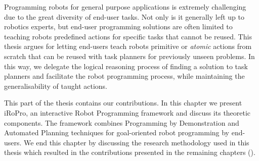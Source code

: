 \minitoc%
Programming robots for general purpose applications is extremely challenging due to the great diversity of end-user tasks.
Not only is it generally left up to robotics experts, but end-user programming solutions are often limited to teaching robots predefined actions for specific tasks that cannot be reused.
This thesis argues for letting end-users teach robots primitive or \textit{atomic} actions from scratch that can be reused with task planners for previously unseen problems.
In this way, we delegate the logical reasoning process of finding a solution to task planners and facilitate the robot programming process, while maintaining the generalisability of taught actions.

This part of the thesis contains our contributions.
In this chapter we present iRoPro, an interactive Robot Programming framework and discuss its theoretic components.
The framework combines Programming by Demonstration and Automated Planning techniques for goal-oriented robot programming by end-users.
We end this chapter by discussing the research methodology used in this thesis which resulted in the contributions presented in the remaining chapters ().

\newpage
